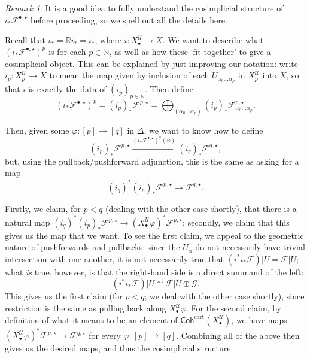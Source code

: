 \documentclass[11pt,fleqn]{article}
\theoremstyle{plain}
\theoremstyle{definition}
\theoremstyle{remark}
\newtheorem{remark}[theorem]{Remark}
\numberwithin{equation}{theorem}
\newcommand{\cover}{\mathcal{U}}
\newcommand{\anotherbullet}{\star}
\newcommand{\yetanotherbullet}{\diamond}
\newcommand{\restricted}{\mathbin{\big\vert}}
\newcommand{\cartcohX}{\mathsf{Coh}^\mathrm{cart}(X_\bullet^\cover)}
\newcommand{\nerve}[1]{X_{#1}^\cover}
\begin{document}
        \begin{remark}\label{remark:what-is-the-pushforward-as-cosimplicial-object}
            It is a good idea to fully understand the cosimplicial structure of $\iota_*\mathcal{F}^{\bullet,\anotherbullet}$ before proceeding, so we spell out all the details here.

            Recall that $\iota_* = \mathbb{R}i_* = i_*$, where $i\colon\nerve{\bullet}\to X$.
            We want to describe what $(\iota_*\mathcal{F}^{\bullet,\anotherbullet})^p$ is for each $p\in\mathbb{N}$, as well as how these `fit together' to give a cosimplicial object.
            This can be explained by just improving our notation: write $i_p\colon\nerve{p}\to X$ to mean the map given by inclusion of each $U_{\alpha_0\ldots\alpha_p}$ in $\nerve{p}$ into $X$, so that $i$ is exactly the data of $(i_p)_{p\in\mathbb{N}}$.
            Then define
            \[
                (\iota_*\mathcal{F}^{\bullet,\anotherbullet})^p
                =
                (i_p)_*\mathcal{F}^{p,\anotherbullet}
                =
                \bigoplus_{(\alpha_0\ldots\alpha_p)} (i_p)_* \mathcal{F}^{p,\anotherbullet}_{\alpha_0\ldots\alpha_p}.
            \]

            Then, given some $\varphi\colon[p]\to[q]$ in $\Delta$, we want to know how to define
            \[
                (i_p)_*\mathcal{F}^{p,\anotherbullet}
                \xrightarrow{(\iota_*\mathcal{F}^{\bullet,\anotherbullet})^\yetanotherbullet(\varphi)}
                (i_q)_*\mathcal{F}^{q,\anotherbullet},
            \]
            but, using the pullback/pushforward adjunction, this is the same as asking for a map
            \[
                (i_q)^*(i_p)_*\mathcal{F}^{p,\anotherbullet}
                \longrightarrow
                \mathcal{F}^{q,\anotherbullet}.
            \]

            Firstly, we claim, for $p<q$ (dealing with the other case shortly), that there is a natural map $(i_q)^*(i_p)_*\mathcal{F}^{p,\anotherbullet} \rightarrow (\nerve{\bullet}\varphi)^*\mathcal{F}^{p,\anotherbullet}$; secondly, we claim that this gives us the map that we want.
            To see the first claim, we appeal to the geometric nature of pushforwards and pullbacks: since the $U_\alpha$ do not necessarily have trivial intersection with one another, it is not necessarily true that $(i^*i_*\mathcal{F})\restricted U = \mathcal{F}\restricted U$; what \emph{is} true, however, is that the right-hand side is a direct summand of the left:
            \[
                (i^*i_*\mathcal{F})\restricted U
                \cong
                \mathcal{F}\restricted U
                \oplus
                \mathcal{G}.
            \]
            This gives us the first claim (for $p<q$; we deal with the other case shortly), since restriction is the same as pulling back along $\nerve{\bullet}\varphi$.
            For the second claim, by definition of what it means to be an element of $\cartcohX$, we have maps $(\nerve{\bullet}\varphi)^*\mathcal{F}^{p,\anotherbullet}\to\mathcal{F}^{q,\anotherbullet}$ for every $\varphi\colon[p]\to[q]$.
            Combining all of the above then gives us the desired maps, and thus the cosimplicial structure.


\end{remark}
\end{document}
